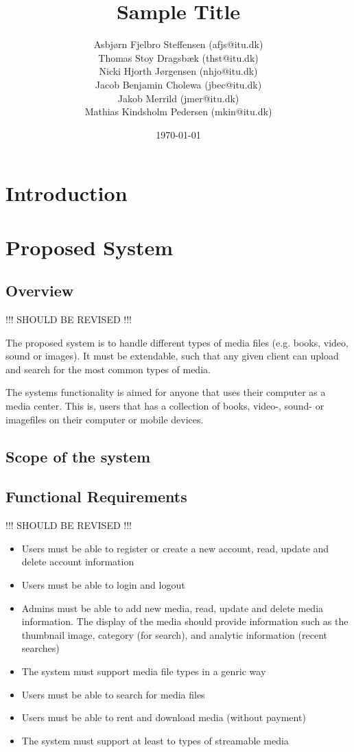 \documentclass{report}
\title{Sample Title}
\date{\today}
\author{Asbj\o rn Fjelbro Steffensen (afjs@itu.dk)\\ Thomas Stoy Dragsb\ae k (thst@itu.dk)\\ Nicki Hjorth J\o rgensen (nhjo@itu.dk)\\ Jacob Benjamin Cholewa (jbec@itu.dk)\\ Jakob Merrild (jmer@itu.dk)\\ Mathias Kindsholm Pedersen (mkin@itu.dk)}
\begin{document}
\maketitle
\newpage
\tableofcontents

\chapter{Introduction}



\chapter{Proposed System}

\section{Overview}

!!! SHOULD BE REVISED !!!

The proposed system is to handle different types of media files (e.g. books, video, sound or images). It must be extendable, such that any given client can upload and search for the most common types of media.

The systems functionality is aimed for anyone that uses their computer as a media center. This is, users that has a collection of books, video-, sound- or imagefiles on their computer or mobile devices.

\section{Scope of the system}


\section{Functional Requirements}
!!! SHOULD BE REVISED !!!
\begin{itemize}
\item Users must be able to register or create a new account, read, update and delete  account information
\item Users must be able to login and logout
\item Admins must be able to add new media, read, update and delete media information. The display of the media should provide information such as the thumbnail image, category (for search), and analytic information (recent searches)
\item The system must support media file types in a genric way
\item Users must be able to search for media files
\item Users must be able to rent and download media (without payment)
\item The system must support at least to types of streamable media
\end{itemize}
\end{document}
